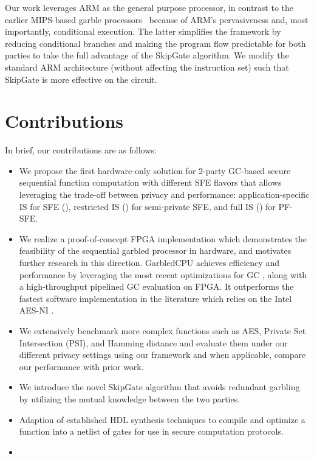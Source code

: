 Our work leverages ARM as the general purpose processor, in contrast to the earlier MIPS-based garble processors~\cite{songhori2015tinygarble, wang2016secure, songhori2016garbledcpu} because of ARM's pervasiveness and, most importantly, conditional execution.
The latter simplifies the framework by reducing conditional branches and making the program flow predictable for both parties to take the full advantage of the SkipGate algorithm.
We modify the standard ARM architecture (without affecting the instruction set) such that SkipGate is more effective on the circuit.

\section{Contributions}
In brief, our contributions are as follows:
\begin{itemize}
\item We propose the first hardware-only solution for 2-party GC-based secure sequential function computation with different SFE flavors that allows leveraging the trade-off between privacy and performance: application-specific IS for SFE (), restricted IS () for semi-private SFE, and full IS () for PF-SFE.
\item We realize a proof-of-concept FPGA implementation which demonstrates the feasibility of the sequential garbled processor in hardware, and motivates further research in this direction. GarbledCPU achieves efficiency and performance by leveraging the most recent optimizations for GC \cite{kolesnikov2008improved,bellare2013efficient,zahur2015two,songhori2015tinygarble}, along with a high-throughput pipelined GC evaluation on FPGA. It outperforms the fastest software implementation in the literature which relies on the Intel AES-NI \cite{bellare2013efficient}.
\item We extensively benchmark more complex functions such as AES, Private Set Intersection (PSI), and Hamming distance and evaluate them under our different privacy settings using our framework and when applicable, compare our performance with prior work.
\item We introduce the novel SkipGate algorithm that avoids redundant garbling by utilizing the mutual knowledge between the two parties.
\item
  Adaption of established HDL synthesis techniques to compile and optimize a function into a netlist of gates for use in secure computation protocols.
\item

\end{itemize}
